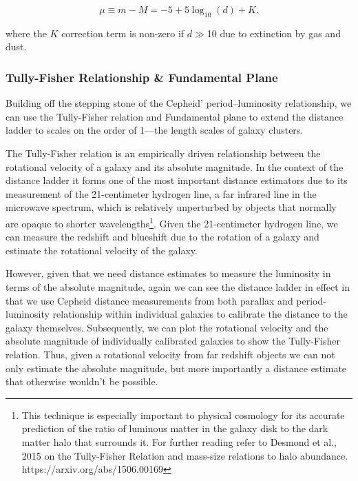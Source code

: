 \begin{equation}\mu \equiv m - M = -5 + 5  \log_{10} (d) + K.\label{eq:distmod}\end{equation}

\noindent where the \(K\) correction term is non-zero if
\(d\gg\)\SI{10}{\parsec} due to extinction by gas and dust.

\subsubsection{Tully-Fisher Relationship \& Fundamental
Plane}\label{tully-fisher-relationship-fundamental-plane}

Building off the stepping stone of the Cepheid' period--luminosity
relationship, we can use the Tully-Fisher relation and Fundamental plane
to extend the distance ladder to scales on the order of
1\si{\Gigaparsec}---the length scales of galaxy clusters.

The Tully-Fisher relation is an empirically driven relationship between
the rotational velocity of a galaxy and its absolute magnitude. In the
context of the distance ladder it forms one of the most important
distance estimators due to its measurement of the 21-centimeter hydrogen
line, a far infrared line in the microwave spectrum, which is relatively
unperturbed by objects that normally are opaque to shorter
wavelengths\footnote{This technique is especially important to physical cosmology for its accurate prediction of the ratio of luminous matter in the galaxy disk to the dark matter halo that surrounds it. For further reading refer to Desmond et al., 2015 on the Tully-Fisher Relation and mass-size relations to halo abundance. https://arxiv.org/abs/1506.00169}.
Given the 21-centimeter hydrogen line, we can measure the redshift and
blueshift due to the rotation of a galaxy and estimate the rotational
velocity of the galaxy.

However, given that we need distance estimates to measure the luminosity
in terms of the absolute magnitude, again we can see the distance ladder
in effect in that we use Cepheid distance measurements from both
parallax and period-luminosity relationship within individual galaxies
to calibrate the distance to the galaxy themselves. Subsequently, we can
plot the rotational velocity and the absolute magnitude of individually
calibrated galaxies to show the Tully-Fisher relation. Thus, given a
rotational velocity from far redshift objects we can not only estimate
the absolute magnitude, but more importantly a distance estimate that
otherwise wouldn't be possible.


